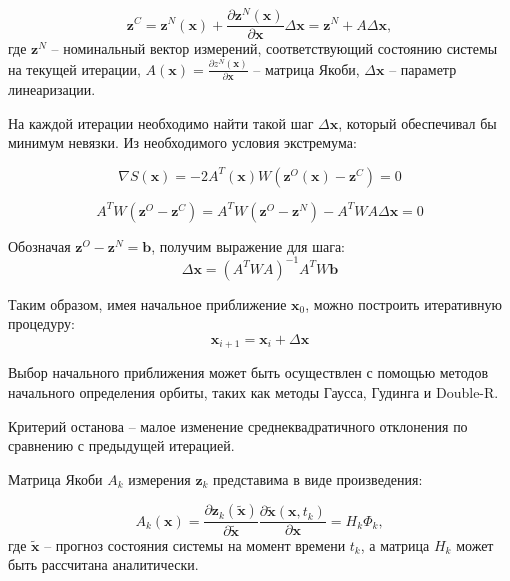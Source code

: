 \begin{equation*}
    \mathbf{z}^C = \mathbf{z}^N (\mathbf{x}) +  
    \frac{\partial \mathbf{z}^N (\mathbf{x})}{\partial \mathbf{x}} \Delta \mathbf{x} = 
    \mathbf{z}^N + A \Delta \mathbf{x},
\end{equation*}
где $\mathbf{z}^N$ -- номинальный вектор измерений, соответствующий состоянию системы на текущей итерации,
 $A (\mathbf{x}) = \frac{\partial z^N (\mathbf{x})}{\partial \mathbf{x}}$ -- матрица Якоби,
 $\Delta \mathbf{x}$ -- параметр линеаризации.

На каждой итерации необходимо найти такой шаг $\Delta \mathbf{x}$, который обеспечивал бы
минимум невязки. Из необходимого условия экстремума:

\begin{equation*}
    \nabla S(\mathbf{x}) = - 2 A^T (\mathbf{x}) W (\mathbf{z}^O (\mathbf{x}) - \mathbf{z}^C) = 0
\end{equation*}

\begin{equation*}
    A^T W (\mathbf{z}^O - \mathbf{z}^C) 
    = A^T W (\mathbf{z}^O - \mathbf{z}^N) - A^T W A \Delta \mathbf{x} = 0
\end{equation*}

Обозначая $\mathbf{z}^O - \mathbf{z}^N = \mathbf{b}$, получим выражение для шага:
\begin{equation}
    \Delta \mathbf{x} = (A^T W A)^{-1} A^T W \mathbf{b}
\end{equation}

Таким образом, имея начальное приближение $\mathbf{x}_{0}$, можно построить итеративную процедуру:
\begin{equation}
    \mathbf{x}_{i + 1} = \mathbf{x}_{i} + \Delta \mathbf{x}
\end{equation}

Выбор начального приближения может быть осуществлен с помощью методов начального
определения орбиты, таких как методы Гаусса, Гудинга и Double-R.

Критерий останова -- малое изменение среднеквадратичного отклонения по сравнению с предыдущей итерацией.

Матрица Якоби $A_k$ измерения $\mathbf{z}_k$ представима в виде произведения:

\begin{equation*}
    A_k(\mathbf{x}) = \frac{\partial \mathbf{z}_k (\mathbf{\tilde{x}})}{\partial \mathbf{\tilde{x}}}
    \frac{\partial \mathbf{\tilde{x}} (\mathbf{x}, t_k)}{\partial \mathbf{x}} = H_k \Phi_k,
\end{equation*}
где $\mathbf{\tilde{x}}$ -- прогноз состояния системы на момент времени $t_k$, 
а матрица $H_k$ может быть рассчитана аналитически.

